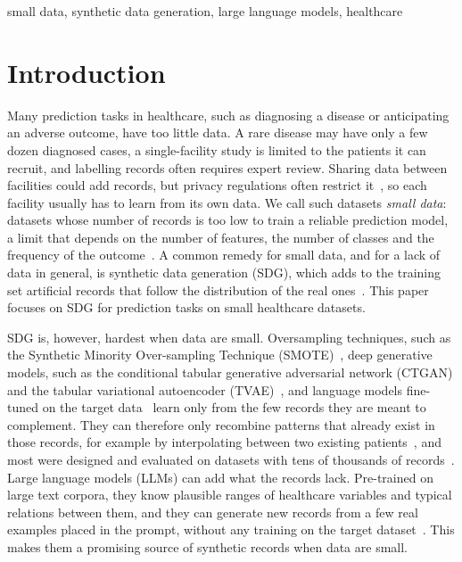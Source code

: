 \documentclass[conference]{IEEEtran}
\begin{document}
\begin{IEEEkeywords}
small data, synthetic data generation, large language models, healthcare
\end{IEEEkeywords}

\section{Introduction}
\label{sec:intro}
Many prediction tasks in healthcare, such as diagnosing a disease or anticipating an adverse outcome, have too little data. A rare disease may have only a few dozen diagnosed cases, a single-facility study is limited to the patients it can recruit, and labelling records often requires expert review. Sharing data between facilities could add records, but privacy regulations often restrict it~\cite{rieke2020digitalhealth}, so each facility usually has to learn from its own data. We call such datasets \emph{small data}: datasets whose number of records is too low to train a reliable prediction model, a limit that depends on the number of features, the number of classes and the frequency of the outcome~\cite{riley2019binary}. A common remedy for small data, and for a lack of data in general, is synthetic data generation (SDG), which adds to the training set artificial records that follow the distribution of the real ones~\cite{qian2023synthcity}. This paper focuses on SDG for prediction tasks on small healthcare datasets.

SDG is, however, hardest when data are small. Oversampling techniques, such as the Synthetic Minority Over-sampling Technique (SMOTE)~\cite{chawla2002smote}, deep generative models, such as the conditional tabular generative adversarial network (CTGAN) and the tabular variational autoencoder (TVAE)~\cite{xu2019ctgan}, and language models fine-tuned on the target data~\cite{borisov2023great,solatorio2023realtabformer} learn only from the few records they are meant to complement. They can therefore only recombine patterns that already exist in those records, for example by interpolating between two existing patients~\cite{chawla2002smote}, and most were designed and evaluated on datasets with tens of thousands of records~\cite{xu2019ctgan,kotelnikov2023tabddpm,zhang2024tabsyn}. Large language models (LLMs) can add what the records lack. Pre-trained on large text corpora, they know plausible ranges of healthcare variables and typical relations between them, and they can generate new records from a few real examples placed in the prompt, without any training on the target dataset~\cite{borisov2023great,seedat2024cllm}. This makes them a promising source of synthetic records when data are small.
\end{document}
